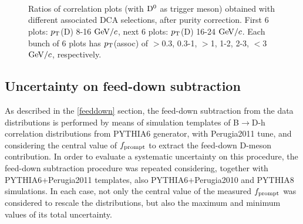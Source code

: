 \begin{figure}[h]
 \\
 \\
 \\
 \caption{Ratios of correlation plots (with ${\rm D^0}$ as trigger meson) obtained with different associated DCA selections, after purity correction. First 6 plots: $p_{\rm T}$(D) 8-16 $\mathrm{GeV}/c$, next 6 plots: $p_{\rm T}$(D) 16-24 $\mathrm{GeV}/c$. Each bunch of 6 plots has $p_{\rm T}$(assoc) of $>$0.3, 0.3-1, $>$1, 1-2, 2-3, $<$3 $\mathrm{GeV}/c$, respectively.}
\label{fig:DCAvarData2}
\end{figure}

\subsection{Uncertainty on feed-down subtraction}
As described in the \ref{feeddown} section, the feed-down subtraction from the data distributions is performed by means of simulation templates of B$\rightarrow$D-h correlation distributions from PYTHIA6 generator, with Perugia2011 tune, and considering the central value of $f_{\rm prompt}$ to extract the feed-down D-meson contribution. In order to evaluate a systematic uncertainty on this procedure, the feed-down subtraction procedure was repeated considering, together with PYTHIA6+Perugia2011 templates, also PYTHIA6+Perugia2010 and PYTHIA8 simulations. In each case, not only the central value of the measured $f_{\rm prompt}$ was considered to rescale the distributions, but also the maximum and minimum values of its total uncertainty.

